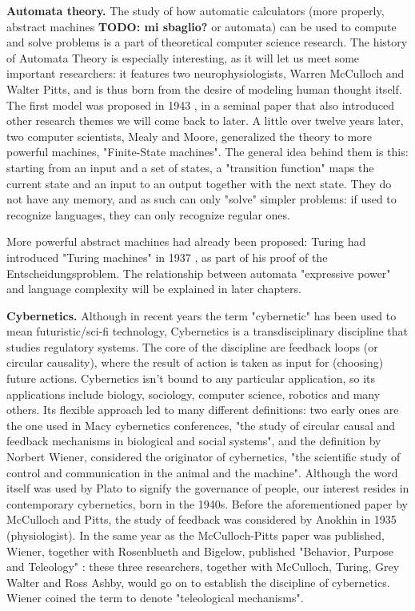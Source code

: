 \documentclass[../main.tex]{subfiles}
\begin{document}
\textbf{Automata theory.} The study of how automatic calculators (more properly, abstract machines \textbf{TODO: mi sbaglio?} or automata) can be used to compute and solve problems is a part of theoretical computer science research. The history of Automata Theory is especially interesting, as it will let us meet some important researchers: it features two neurophysiologists, Warren McCulloch and Walter Pitts, and is thus born from the desire of modeling human thought itself. The first model was proposed in 1943 \cite{mccullochLogicalCalculusIdeas1943}, in a seminal paper that also introduced other research themes we will come back to later. A little over twelve years later, two computer scientists, Mealy and Moore, generalized the theory to more powerful machines, "Finite-State machines". The general idea behind them is this: starting from an input and a set of states, a "transition function" maps the current state and an input to an output together with the next state. They do not have any memory, and as such can only "solve" simpler problems: if used to recognize languages, they can only recognize regular ones.

More powerful abstract machines had already been proposed: Turing had introduced "Turing machines" in 1937 \cite{turingComputableNumbersApplication1937}, as part of his proof of the Entscheidungsproblem. The relationship between automata "expressive power" and language complexity will be explained in later chapters.

\textbf{Cybernetics.} Although in recent years the term "cybernetic" has been used to mean futuristic/sci-fi technology, Cybernetics is a transdisciplinary discipline that studies regulatory systems. The core of the discipline are feedback loops (or circular causality), where the result of action is taken as input for (choosing) future actions. Cybernetics isn't bound to any particular application, so its applications include biology, sociology, computer science, robotics and many others. Its flexible approach led to many different definitions: two early ones are the one used in Macy cybernetics conferences, "the study of circular causal and feedback mechanisms in biological and social systems"\cite{steerCyberneticsCircularCausal1952}, and the definition by Norbert Wiener, considered the originator of cybernetics, "the scientific study of control and communication in the animal and the machine"\cite{wienerCyberneticsControlCommunication1961}. Although the word itself was used by Plato to signify the governance of people, our interest resides in contemporary cybernetics, born in the 1940s. Before the aforementioned paper by McCulloch and Pitts, the study of feedback was considered by Anokhin in 1935 \cite{anokhinProblemsCentrePeriphery1935} (physiologist). In the same year as the McCulloch-Pitts paper was published, Wiener, together with Rosenblueth and Bigelow, published "Behavior, Purpose and Teleology" \cite{rosenbluethBehaviorPurposeTeleology1943}: these three researchers, together with McCulloch, Turing, Grey Walter and Ross Ashby, would go on to establish the discipline of cybernetics. Wiener coined the term to denote "teleological mechanisms".
\end{document}
